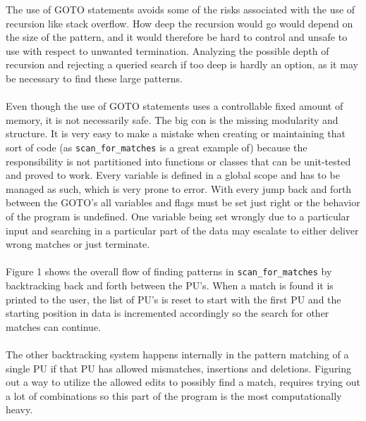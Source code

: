 \documentclass[12pt]{article}
\newcommand{\scm}{\texttt{scan\_for\_matches} }
\newcommand{\pu}{PU }
\newcommand{\pus}{PU's }
\begin{document}
%    
\noindent The use of GOTO statements avoids some of the risks associated with the use of recursion like stack overflow. 
How deep the recursion would go would depend on the size of the pattern, and it would therefore be hard to control and
unsafe to use with respect to unwanted termination. Analyzing the possible depth of recursion and rejecting a queried search
if too deep is hardly an option, as it may be necessary to find these large patterns. \\ \\
Even though the use of GOTO statements uses a controllable fixed amount of
memory, it is not necessarily safe. The big con is the missing modularity and structure. 
It is very easy to make a mistake when creating or maintaining that sort of code
(as \scm is a great example of)
because the responsibility is not partitioned into functions or classes that can be unit-tested and proved to work.
Every variable is defined in a global scope and has to be managed as such, which is very prone to error. With every
jump back and forth between the GOTO's all variables and flags must be set just right or the behavior of the program
is undefined. 
One variable being set wrongly due to a particular input and searching in a particular part of the data may 
escalate to either deliver wrong matches or just terminate. \\ \\
Figure 1 shows the overall flow of finding patterns in \scm by backtracking back and forth between the PU's. When
a match is found it is printed to the user, the list of \pus is reset to start with the first \pu and the 
starting position in data is incremented accordingly so the search for other matches can continue. \\ \\
The other backtracking system happens internally in the pattern matching of a single \pu if that \pu has allowed
mismatches, insertions and deletions. Figuring out a way to utilize the allowed edits to possibly find a match, requires
trying out a lot of combinations so this part of the program is the most computationally heavy. 
\end{document}
